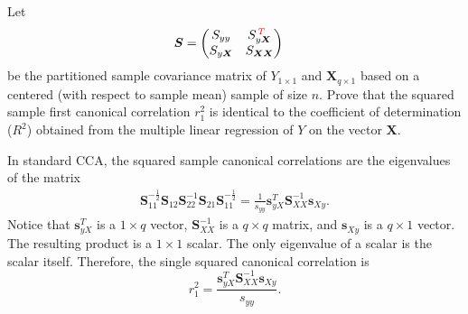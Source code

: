 \documentclass[addpoints,answers,a4paper,11pt]{exam}
\begin{document}
\begin{questions}

   \question[6]
   Let 
   \begin{align*}
      \boldsymbol{S} &= \begin{pmatrix} 
         S_{yy} & S_{y \boldsymbol{X}}^{\,\textcolor{red}{T}} \\
         S_{y \boldsymbol{X}} & S_{\boldsymbol{X} \boldsymbol{X}}
      \end{pmatrix}      
   \end{align*}
   be the partitioned sample covariance matrix of $Y_{1\times 1}$ and
   $\boldsymbol{X}_{q \times 1}$ based on a centered (with respect to sample
   mean) sample of size $n$.  Prove that the squared sample first canonical
   correlation $r_1^2$ is identical to the coefficient of determination ($R^2$)
   obtained from the multiple linear regression of $Y$ on the vector
   $\boldsymbol{X}$.

   \begin{solution}
      In standard CCA, the squared sample canonical correlations are
      the eigenvalues of the matrix 
      \begin{align*}
         \mathbf{S}_{11}^{-\frac{1}{2}}
         \mathbf{S}_{12} \mathbf{S}_{22}^{-1}
         \mathbf{S}_{21}\mathbf{S}_{11}^{-\frac{1}{2}} = 
         \frac{1}{s_{yy}} \mathbf{s}_{yX}^T
         \mathbf{S}_{XX}^{-1} \mathbf{s}_{Xy}.
      \end{align*}
      Notice that $\mathbf{s}_{yX}^T$ is a $1 \times q$ vector,
      $\mathbf{S}_{XX}^{-1}$ is a $q \times q$ matrix, and $\mathbf{s}_{Xy}$
      is a $q \times 1$ vector. The resulting product is a $1 \times 1$
      scalar. The only eigenvalue of a scalar is the scalar itself.
      Therefore, the single squared canonical correlation is
      \begin{equation} \label{eq:r2}
         r_1^2 = \frac{\mathbf{s}_{yX}^T \mathbf{S}_{XX}^{-1}
         \mathbf{s}_{Xy}}{s_{yy}}.
      \end{equation}


\end{solution}
\end{questions}
\end{document}
